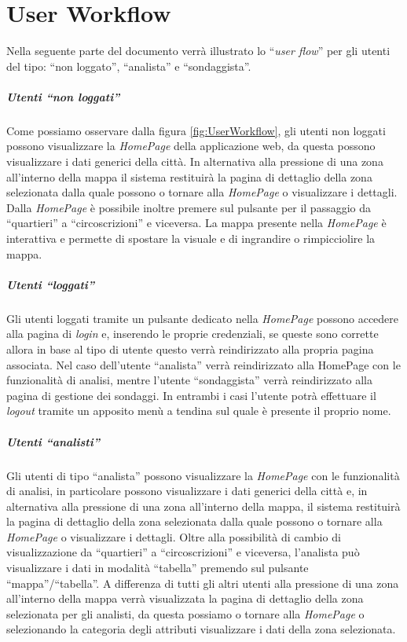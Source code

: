 \chapter{User Workflow}
Nella seguente parte del documento verrà illustrato lo ``\textit{user flow}'' per gli utenti del tipo: ``non loggato'', ``analista'' e ``sondaggista''.
\paragraph{Utenti ``non loggati''} Come possiamo osservare dalla figura \ref{fig:UserWorkflow}, gli utenti non loggati possono visualizzare la \textit{HomePage} della applicazione web, da questa possono visualizzare i dati generici della città. In alternativa alla pressione di una zona all'interno della mappa il sistema restituirà la pagina di dettaglio della zona selezionata dalla quale possono o tornare alla \textit{HomePage} o visualizzare i dettagli. Dalla \textit{HomePage} è possibile inoltre premere sul pulsante per il passaggio da ``quartieri'' a ``circoscrizioni'' e viceversa. La mappa presente nella \textit{HomePage} è interattiva e permette di spostare la visuale e di ingrandire o rimpicciolire la mappa.
\paragraph{Utenti ``loggati''} Gli utenti loggati tramite un pulsante dedicato nella \textit{HomePage} possono accedere alla pagina di \textit{login} e, inserendo le proprie credenziali, se queste sono corrette allora in base al tipo di utente questo verrà reindirizzato alla propria pagina associata. Nel caso dell'utente ``analista'' verrà reindirizzato alla HomePage con le funzionalità di analisi, mentre l'utente ``sondaggista'' verrà reindirizzato alla pagina di gestione dei sondaggi. In entrambi i casi l'utente potrà effettuare il \textit{logout} tramite un apposito menù a tendina sul quale è presente il proprio nome.
\paragraph{Utenti ``analisti''} Gli utenti di tipo ``analista'' possono visualizzare la \textit{HomePage} con le funzionalità di analisi, in particolare possono visualizzare i dati generici della città e, in alternativa alla pressione di una zona all'interno della mappa, il sistema restituirà la pagina di dettaglio della zona selezionata dalla quale possono o tornare alla \textit{HomePage} o visualizzare i dettagli. Oltre alla possibilità di cambio di visualizzazione da ``quartieri'' a ``circoscrizioni'' e viceversa, l'analista può visualizzare i dati in modalità ``tabella'' premendo sul pulsante ``mappa''/``tabella''. A differenza di tutti gli altri utenti alla pressione di una zona all'interno della mappa verrà visualizzata la pagina di dettaglio della zona selezionata per gli analisti, da questa possiamo o tornare alla \textit{HomePage} o selezionando la categoria degli attributi visualizzare i dati della zona selezionata.
